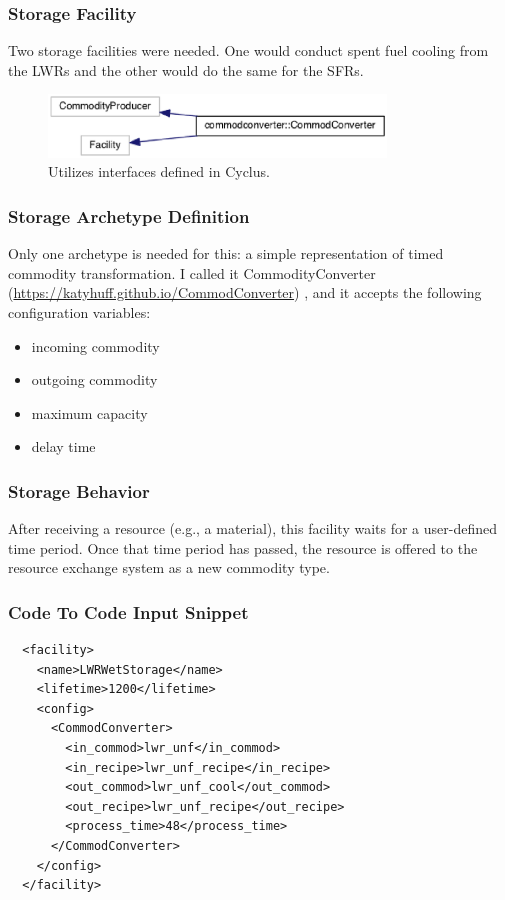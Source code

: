 \begin{frame}[fragile]
  \frametitle{Storage Facility}
Two storage facilities were needed. One would conduct spent fuel cooling from
the LWRs and the other would do the same for the SFRs. 
\begin{figure}[htbp!]
\begin{center}
\includegraphics[width=0.8\textwidth]{cc_inherit}
\end{center}
\caption{Utilizes interfaces defined in Cyclus.}
\label{fig:cc_inherit}
\end{figure}
\end{frame}
\begin{frame}[fragile]
  \frametitle{Storage Archetype Definition}
Only one archetype is needed for this:  a simple representation of timed commodity transformation. 
 I called it CommodityConverter 
 (\url{https://katyhuff.github.io/CommodConverter}) \cite{huff_market_2014}, and it accepts the following configuration variables:
\begin{itemize}
\item incoming commodity
\item outgoing commodity 
\item maximum capacity
\item delay time
\end{itemize}
\end{frame}
\begin{frame}[fragile]
  \frametitle{Storage Behavior}
After receiving a resource
(e.g., a material), this facility waits for a user-defined time period. Once
that time period has passed, the resource is offered to the resource exchange
system as a new commodity type. 
\end{frame}
\begin{frame}[fragile]
  \frametitle{Code To Code Input Snippet}
\begin{lstlisting}
  <facility>
    <name>LWRWetStorage</name>
    <lifetime>1200</lifetime>
    <config>
      <CommodConverter>
        <in_commod>lwr_unf</in_commod>
        <in_recipe>lwr_unf_recipe</in_recipe>
        <out_commod>lwr_unf_cool</out_commod>
        <out_recipe>lwr_unf_recipe</out_recipe>
        <process_time>48</process_time>
      </CommodConverter>
    </config>
  </facility>
\end{lstlisting}
\end{frame}
